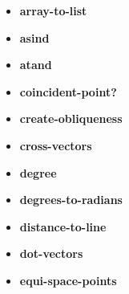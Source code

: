 \documentclass [11pt]{book}
\begin{document}
\begin{itemize}
\item {}
\label{prim:array-to-list}
\textbf{array-to-list}





\item {}
\label{prim:asind}
\textbf{asind}





\item {}
\label{prim:atand}
\textbf{atand}





\item {}
\label{prim:coincident-point?}
\textbf{coincident-point?}





\item {}
\label{prim:create-obliqueness}
\textbf{create-obliqueness}





\item {}
\label{prim:cross-vectors}
\textbf{cross-vectors}





\item {}
\label{prim:degree}
\textbf{degree}





\item {}
\label{prim:degrees-to-radians}
\textbf{degrees-to-radians}





\item {}
\label{prim:distance-to-line}
\textbf{distance-to-line}





\item {}
\label{prim:dot-vectors}
\textbf{dot-vectors}





\item {}
\label{prim:equi-space-points}
\textbf{equi-space-points}






\end{itemize}
\end{document}
